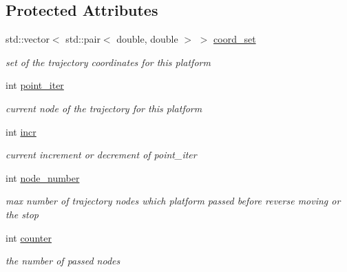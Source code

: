 \subsection*{Protected Attributes}
\begin{DoxyCompactItemize}
\item 
\mbox{\label{class_platform_a17b9655a30c0c75e237cb54ce5939901}} 
std\+::vector$<$ std\+::pair$<$ double, double $>$ $>$ \hyperlink{class_platform_a17b9655a30c0c75e237cb54ce5939901}{coord\+\_\+set}
\begin{DoxyCompactList}\small\item\em set of the trajectory coordinates for this platform \end{DoxyCompactList}\item 
\mbox{\label{class_platform_a5cffd298e38b51b6a079721d9ddafd1a}} 
int \hyperlink{class_platform_a5cffd298e38b51b6a079721d9ddafd1a}{point\+\_\+iter}
\begin{DoxyCompactList}\small\item\em current node of the trajectory for this platform \end{DoxyCompactList}\item 
\mbox{\label{class_platform_a6a72a0e87078f6ec39d2638b0826c3f9}} 
int \hyperlink{class_platform_a6a72a0e87078f6ec39d2638b0826c3f9}{incr}
\begin{DoxyCompactList}\small\item\em current increment or decrement of point\+\_\+iter \end{DoxyCompactList}\item 
\mbox{\label{class_platform_ac7e442d3f0cbb881046089a27de27270}} 
int \hyperlink{class_platform_ac7e442d3f0cbb881046089a27de27270}{node\+\_\+number}
\begin{DoxyCompactList}\small\item\em max number of trajectory nodes which platform passed before reverse moving or the stop \end{DoxyCompactList}\item 
\mbox{\label{class_platform_ac237ae97ec177455984a8ceb80ad294a}} 
int \hyperlink{class_platform_ac237ae97ec177455984a8ceb80ad294a}{counter}
\begin{DoxyCompactList}\small\item\em the number of passed nodes \end{DoxyCompactList}\item 

\end{DoxyCompactItemize}
